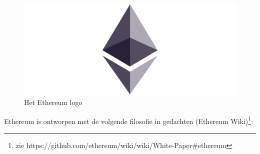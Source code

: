 			\begin{figure}
				\includegraphics[width=\linewidth]{img/ethereum.png}
				\caption{Het Ethereum logo}
				\label{fig:ethereum}
			\end{figure}
			
			Ethereum is ontworpen met de volgende filosofie in gedachten (Ethereum Wiki)\footnote{zie https://github.com/ethereum/wiki/wiki/White-Paper\#ethereum}:
